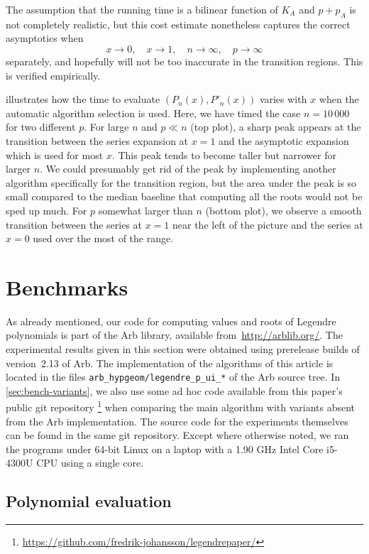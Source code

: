 \documentclass[nohypdvips,review]{siamart0216}
\begin{document}
The assumption that the running time is a bilinear function of $K_A$ and $p + p_A$
is not completely realistic, but this cost estimate nonetheless captures the
correct asymptotics when
$$x \to 0, \quad x \to 1, \quad n \to \infty, \quad p \to \infty$$
separately, and hopefully will not be too inaccurate in the transition regions.
This is verified empirically.

 illustrates how the time to evaluate
$(P_n(x), P'_n(x))$ varies with $x$ when the automatic algorithm selection is used.
Here, we have timed the case $n = 10\,000$ for two different $p$.
For large $n$ and $p \ll n$ (top plot), a sharp peak appears at the transition between the series
expansion at $x = 1$ and the asymptotic expansion which is used for most $x$.
This peak tends to become taller
but narrower for larger $n$.
We could presumably get rid of the peak by implementing another algorithm
specifically for the transition region, but the area under the peak is so small
compared to the median baseline that computing all the roots
would not be sped up much.
For $p$ somewhat larger than $n$ (bottom plot), we observe a smooth transition between the
series at $x = 1$ near the left of the picture and the series at $x = 0$
used over the most of the range.

\section{Benchmarks}

As already mentioned, our code for computing values and roots of
Legendre polynomials is part of the Arb library, available
from~\url{http://arblib.org/}.
The experimental results given in this section were obtained using
prerelease builds of
version~2.13 of Arb.
The implementation of the algorithms of this article is located in the
files \texttt{arb\_hypgeom/legendre\_p\_ui\_*} of the Arb source tree.
In \cref{sec:bench-variants}, we also use some ad hoc code available
from this paper's public git repository%
\footnote{\url{https://github.com/fredrik-johansson/legendrepaper/}}
when comparing the main algorithm with variants absent from the Arb
implementation.
The source code for the experiments themselves can be found in the same
git repository.
Except where otherwise noted, we ran the programs under 64-bit Linux on a
laptop with a
1.90 GHz Intel Core i5-4300U CPU using a single core.

\label{sec:bench}

\subsection{Polynomial evaluation}
\end{document}
